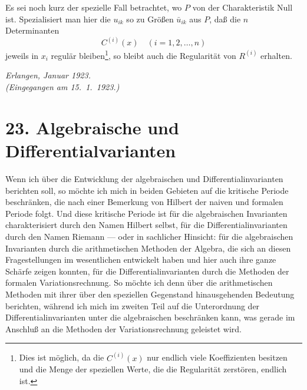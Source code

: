 \documentclass[fontsize=10pt,paper=a5,pagesize,headings=small]{scrbook}
\theoremstyle{plain}
\begin{document}
Es sei noch kurz der spezielle Fall betrachtet, wo $P$ von der Charakteristik Null
ist. Spezialisiert man hier die $u_{ik}$ so zu Größen $\bar{u}_{ik}$ aus $P$, daß die $n$ Determinanten
\[ C^{(i)}(x) \quad (i=1,2,\dots,n) \]
jeweils in $x_i$ regulär bleiben\footnote{Dies ist möglich, da die $C^{(i)}(x)$ nur endlich
viele Koeffizienten besitzen und die Menge der speziellen Werte, die die Regularität zerstören,
endlich ist.}, so bleibt auch die Regularität von $R^{(i)}$ erhalten.

\vfill
\begin{flushright}
\textit{Erlangen, Januar 1923.}\\[4pt]
\textit{(Eingegangen am 15.\ 1.\ 1923.)}
\end{flushright}

\newpage

\section*{23. Algebraische und Differentialvarianten\footnotemark[0]}


\setcounter{page}{450}

Wenn ich über die Entwicklung der algebraischen und Differentialinvarianten
berichten soll, so möchte ich mich in beiden Gebieten auf die kritische Periode
beschränken, die nach einer Bemerkung von Hilbert der naiven und formalen
Periode folgt. Und diese kritische Periode ist für die algebraischen Invarianten
charakterisiert durch den Namen Hilbert selbst, für die Differentialinvarianten
durch den Namen Riemann --- oder in sachlicher Hinsicht: für die algebraischen
Invarianten durch die arithmetischen Methoden der Algebra, die sich an diesen
Fragestellungen im wesentlichen entwickelt haben und hier auch ihre ganze
Schärfe zeigen konnten, für die Differentialinvarianten durch die Methoden der
formalen Variationsrechnung. So möchte ich denn über die arithmetischen
Methoden mit ihrer über den speziellen Gegenstand hinausgehenden Bedeutung
berichten, während ich mich im zweiten Teil auf die Unterordnung der
Differentialinvarianten unter die algebraischen beschränken kann, was gerade
im Anschluß an die Methoden der Variationsrechnung geleistet wird.
\end{document}
